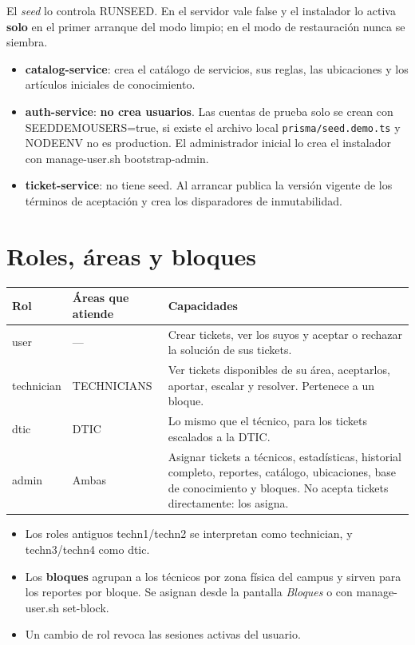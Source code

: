 \documentclass[11pt,a4paper,oneside]{report}
\newcommand{\codus}{\textunderscore\allowbreak}
\DeclareRobustCommand{\cod}[1]{{\small\ttfamily\let\_\codus #1}}
\DeclareRobustCommand{\ruta}[1]{{\small\nolinkurl{#1}}}
\newcommand{\cabecera}{\rowcolor{utaRojo!12}}
\begin{document}
El \emph{seed} lo controla \cod{RUN\_SEED}. En el servidor vale \cod{false} y el instalador lo activa
\textbf{solo} en el primer arranque del modo limpio; en el modo de restauración nunca se siembra.
\begin{itemize}
  \item \textbf{catalog-service}: crea el catálogo de servicios, sus reglas, las ubicaciones y los
        artículos iniciales de conocimiento.
  \item \textbf{auth-service}: \textbf{no crea usuarios}. Las cuentas de prueba solo se crean con
        \cod{SEED\_DEMO\_USERS=true}, si existe el archivo local \ruta{prisma/seed.demo.ts} y \cod{NODE\_ENV}
        no es \cod{production}. El administrador inicial lo crea el instalador con \cod{manage-user.sh bootstrap-admin}.
  \item \textbf{ticket-service}: no tiene seed. Al arrancar publica la versión vigente de los términos
        de aceptación y crea los disparadores de inmutabilidad.
\end{itemize}

\chapter{Roles, áreas y bloques}

\begin{center}
\begin{tabularx}{\linewidth}{@{}P{2.2cm}P{2.9cm}L@{}}
\toprule
\cabecera \textbf{Rol} & \textbf{Áreas que atiende} & \textbf{Capacidades} \\
\midrule
\cod{user} & — & Crear tickets, ver los suyos y aceptar o rechazar la solución de sus tickets. \\
\cod{technician} & TECHNICIANS & Ver tickets disponibles de su área, aceptarlos, aportar, escalar y resolver. Pertenece a un bloque. \\
\cod{dtic} & DTIC & Lo mismo que el técnico, para los tickets escalados a la DTIC. \\
\cod{admin} & Ambas & Asignar tickets a técnicos, estadísticas, historial completo, reportes, catálogo, ubicaciones, base de conocimiento y bloques. No acepta tickets directamente: los asigna. \\
\bottomrule
\end{tabularx}
\end{center}

\begin{itemize}
  \item Los roles antiguos \cod{tech\_n1}/\cod{tech\_n2} se interpretan como \cod{technician}, y \cod{tech\_n3}/\cod{tech\_n4} como \cod{dtic}.
  \item Los \textbf{bloques} agrupan a los técnicos por zona física del campus y sirven para los reportes por bloque. Se asignan desde la pantalla \emph{Bloques} o con \cod{manage-user.sh set-block}.
  \item Un cambio de rol revoca las sesiones activas del usuario.
\end{itemize}
\end{document}
